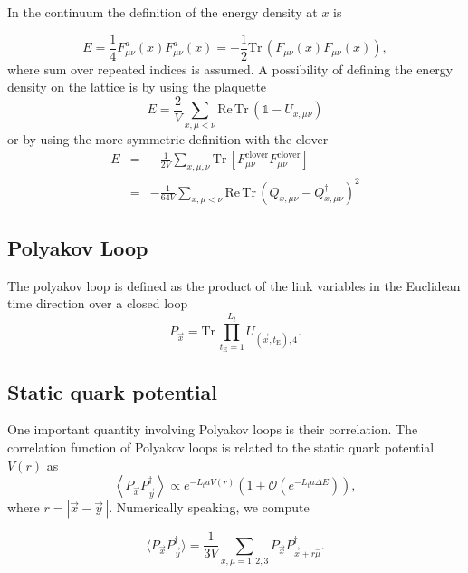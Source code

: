 \documentclass[12pt,a4paper]{article}
\newcommand{\tr}{\text{Tr}\,}
\newcommand{\re}{\text{Re}\,}
\begin{document}
    In the continuum the definition of the energy density at $x$ is
    
    \begin{equation}
        E = \frac{1}{4} F_{\mu\nu}^{a}(x)F_{\mu\nu}^{a}(x) = -\frac{1}{2} \tr\left( F_{\mu\nu}(x)F_{\mu\nu}(x)\right),
    \end{equation}
where sum over repeated indices is assumed.
A possibility of defining the energy density on the lattice is by using the plaquette
\begin{equation}
    E = \frac{2}{V}\sum_{x,\mu<\nu}\re\tr\left(\mathds{1} - U_{x,\mu\nu} \right)
\end{equation}
or by using the more symmetric definition with the clover
\begin{eqnarray}
    E & = & -\frac{1}{2V}\sum_{x,\mu,\nu}\tr\left[F^{\text{clover}}_{\mu\nu}F^{\text{clover}}_{\mu\nu} \right]\\
      & = & -\frac{1}{64V}\sum_{x,\mu<\nu} \re\tr\left( Q_{x,\mu\nu} -  Q_{x,\mu\nu}^{\dagger}\right)^2
\end{eqnarray}




	\subsection{Polyakov Loop}
	The polyakov loop is defined as the product of the link variables in the Euclidean time direction over a closed loop
	\begin{equation}
		P_{\vec{x}} = \text{Tr}\,\prod_{t_\text{E}=1}^{L_t}U_{(\vec{x},t_\text{E}),4}.
	\end{equation}

\subsection{Static quark potential}
One important quantity involving Polyakov loops is their correlation. The correlation function of Polyakov loops is related to the static quark potential $V(r)$ as
\begin{equation}
	\left\langle P_{\vec{x}} P_{\vec{y}}^{\dagger} \right\rangle \propto e^{-L_t a V(r)} \left(1 +\mathcal{O}\left( e^{-L_t a \Delta E}\right) \right),
\end{equation}
where $r = |\vec{x} - \vec{y}\,|$. Numerically speaking, we compute

\begin{equation}
	\langle P_{\vec{x}} P_{\vec{y}}^{\dagger} \rangle = \frac{1}{3V}\sum_{x,\mu = 1,2,3}  P_{\vec{x}} P_{\vec{x}+r\hat{\mu}}^{\dagger}.
\end{equation}
\end{document}
